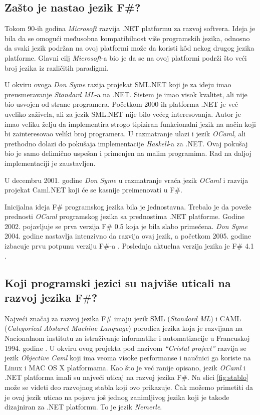 \documentclass[a4paper]{article}
\begin{document}
\subsection{Zašto je nastao jezik F\#?}
\label{subsec:nastanak}

Tokom 90-ih godina {\em Microsoft} razvija .NET \cite{microsoft_.net,early_history} platformu za razvoj softvera. Ideja je bila da se omogući međusobna kompatibilnost više programskih jezika, odnosno da svaki jezik podržan na ovoj platformi može da koristi kôd nekog drugog jezika platforme. Glavni cilj {\em Microsoft}-a bio je da se na ovoj platformi podrži što veći broj jezika iz različitih paradigmi. 

U okviru ovoga {\em Don Syme} razija projekat SML.NET koji je za ideju imao preusmeravanje {\em Standard ML}-a na .NET. Sistem je imao visok kvalitet, ali nije bio usvojen od strane programera. Početkom 2000-ih platforma .NET je već uveliko zaživela, ali za jezik SML.NET nije bilo većeg interesovanja. Autor je imao veliku želju da implementira strogo tipiziran funkcionalni jezik na način koji bi zainteresovao veliki broj programera. U razmatranje ulazi i jezik {\em OCaml}, ali prethodno dolazi do pokušaja implementacije {\em Haskell}-a za .NET. Ovaj pokušaj bio je samo delimično uspešan i primenjen na malim programima. Rad na daljoj implementaciji je zaustavljen.

U decembru 2001. godine {\em Don Syme} u razmatranje vraća jezik {\em OCaml} i razvija projekat Caml.NET koji će se kasnije preimenovati u F\#.

Inicijalna ideja F\# programskog jezika bila je jednostavna. Trebalo je da poveže prednosti {\em OCaml} programskog jezika sa prednostima .NET platforme. Godine 2002. pojavljuje se prva verzija F\# 0.5 koja je bila slabo primećena. {\em Don Syme} 2004. godine nastavlja intenzivno da razvija ovaj jezik, a početkom 2005. godine izbacuje prvu potpunu verziju F\#-a \cite{early_history}.
Poslednja aktuelna verzija jezika je F\# 4.1 \cite{fsharp}.

\subsection{Koji programski jezici su najviše uticali na razvoj jezika F$\#$?}
\label{subsec:uticaj}

Najveći značaj za razvoj jezika F\# imaju jezik SML ({\em Standard ML}) i CAML ({\em Categorical Abstarct Machine Language}) porodica jezika koja je razvijana na Nacionalnom institutu za istraživanje informatike i automatizacije u Francuskoj 1994. godine \cite{Harrop:2008:FS:1481410}. U okviru ovog projekta pod nazivom {\em “Cristal project”} razvija se jezik {\em Objective Caml} koji ima veoma visoke performanse i naučnici ga koriste na Linux i MAC OS X platformama. Kao što je već ranije opisano, jezik {\em OCaml} i .NET platforma imali su najveći uticaj na razvoj jezika F\#. Na slici \ref{fig:stablo} može se videti deo razvojnog stabla koji ovo prikazuje. Čak možemo primetiti da je ovaj jezik uticao na pojavu još jednog zanimljivog jezika koji je takođe dizajniran za .NET platformu. To je jezik {\em Nemerle}.
\end{document}
